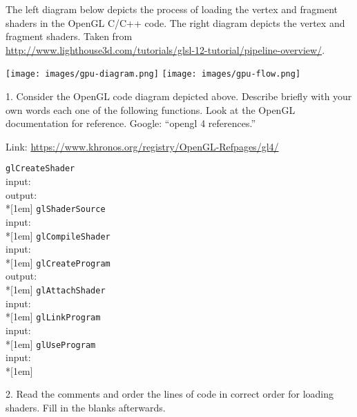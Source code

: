 \documentclass[12pt]{article}
\newcommand{\TODOL}[1]{\textcolor{red}{\underline{\hspace{#1 cm}}}}
\begin{document}
The left diagram below depicts the process of loading the vertex and fragment
shaders in the OpenGL C/C++ code. The right diagram depicts the vertex and
fragment shaders.  Taken from\\
\href{https://www.google.com/url?q=http://www.lighthouse3d.com/tutorials/glsl-12-tutorial/pipeline-overview/\&sa=D\&ust=1601679253988000\&usg=AOvVaw24XGbOqgiEH0AFlwC_2n_a}{http://www.lighthouse3d.com/tutorials/glsl-12-tutorial/pipeline-overview/}.

\texttt{[image: images/gpu-diagram.png]}%
\texttt{[image: images/gpu-flow.png]}

1. Consider the OpenGL code diagram depicted above. Describe briefly with your
own words each one of the following functions. Look at the OpenGL documentation
for reference.  Google: ``opengl 4 references.''

Link:
\href{https://www.google.com/url?q=https://www.khronos.org/registry/OpenGL-Refpages/gl4/\&sa=D\&ust=1601679253989000\&usg=AOvVaw04dktDekd6O2yRGd862SNn}{https://www.khronos.org/registry/OpenGL-Refpages/gl4/}

\texttt{glCreateShader}\\
input: \TODOL6\\
output: \TODOL6\\*[1em]
\texttt{glShaderSource}\\
input: \TODOL6\\*[1em]
\texttt{glCompileShader}\\
input: \TODOL6\\*[1em]
\texttt{glCreateProgram}\\
output: \TODOL6\\*[1em]
\texttt{glAttachShader}\\
input: \TODOL6\\*[1em]
\texttt{glLinkProgram}\\
input: \TODOL6\\*[1em]
\texttt{glUseProgram}\\
input: \TODOL6\\*[1em]

2. Read the comments and order the lines of code in correct order for loading
shaders.  Fill in the blanks afterwards.
\end{document}
